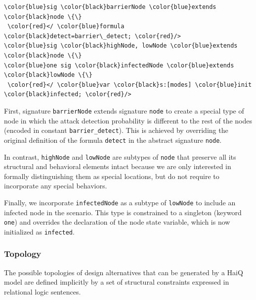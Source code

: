 \documentclass[10pt,journal,compsoc]{IEEEtran}
\begin{document}
{\scriptsize
\begin{Verbatim}[commandchars=\\\{\},codes={\catcode`$=3\catcode`^=7\catcode`_=8}]
\color{blue}sig \color{black}barrierNode \color{blue}extends \color{black}node \{\} 
 \color{red}</ \color{blue}formula \color{black}detect=barrier\_detect; \color{red}/>
\color{blue}sig \color{black}highNode, lowNode \color{blue}extends \color{black}node \{\}
\color{blue}one sig \color{black}infectedNode \color{blue}extends \color{black}lowNode \{\} 
 \color{red}</ \color{blue}var \color{black}s:[modes] \color{blue}init \color{black}infected; \color{red}/>
\end{Verbatim}
}

First, signature {\tt barrierNode} extends signature {\tt node} to create a special type of node in which the attack detection probability is different to the rest of the nodes (encoded in constant {\tt barrier\_detect}). This is achieved by overriding the original definition of the formula {\tt detect} in the abstract signature {\tt node}.

In contrast, {\tt highNode} and {\tt lowNode} are subtypes of {\tt node} that preserve all its structural and behavioral elements intact because we are only interested in formally distinguishing them as special locations, but do not require to incorporate any special behaviors.

Finally, we incorporate {\tt infectedNode} as a subtype of {\tt lowNode} to include an infected node in the scenario. This type is constrained to a singleton (keyword {\tt one}) and overrides the declaration of the node state variable, which is now initialized as {\tt infected}.

\subsubsection{Topology}

The possible topologies of design alternatives that can be generated by a {\sf HaiQ} model are defined implicitly by a set of structural constraints expressed in relational logic sentences. 
\end{document}
